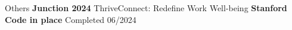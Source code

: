 \begin{rubric}{Others}
\entry*[Hackathon]%
	\textbf{Junction 2024} ThriveConnect: Redefine Work Well-being
%
	\textbf{Stanford Code in place} Completed 06/2024
%
\end{rubric}